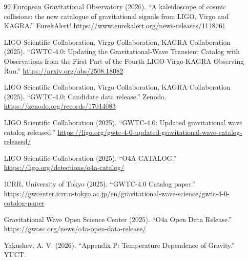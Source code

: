 \documentclass[12pt,a4paper]{article}
\theoremstyle{remark}
\begin{document}
\begin{thebibliography}{99}
		European Gravitational Observatory (2026). ``A kaleidoscope of cosmic collisions: the new catalogue of gravitational signals from LIGO, Virgo and KAGRA.'' EurekAlert! \url{https://www.eurekalert.org/news-releases/1118761}
		
		LIGO Scientific Collaboration, Virgo Collaboration, KAGRA Collaboration (2025). ``GWTC-4.0: Updating the Gravitational-Wave Transient Catalog with Observations from the First Part of the Fourth LIGO-Virgo-KAGRA Observing Run.'' \url{https://arxiv.org/abs/2508.18082}
		
		LIGO Scientific Collaboration, Virgo Collaboration, KAGRA Collaboration (2025). ``GWTC-4.0: Candidate data release.'' Zenodo. \url{https://zenodo.org/records/17014083}
		
		LIGO Scientific Collaboration (2025). ``GWTC-4.0: Updated gravitational wave catalog released.'' \url{https://ligo.org/gwtc-4-0-updated-gravitational-wave-catalog-released/}
		
		LIGO Scientific Collaboration (2025). ``O4A CATALOG.'' \url{https://ligo.org/detections/o4a-catalog/}
		
		ICRR, University of Tokyo (2025). ``GWTC-4.0 Catalog paper.'' \url{https://gwcenter.icrr.u-tokyo.ac.jp/en/gravitational-wave-science/gwtc-4-0-catalog-paper}
		
		Gravitational Wave Open Science Center (2025). ``O4a Open Data Release.'' \url{https://gwosc.org/news/o4a-open-data-release/}
		
		Yakushev, A. V. (2026). ``Appendix P: Temperature Dependence of Gravity.'' YUCT.
	\end{thebibliography}
	
\end{document}
